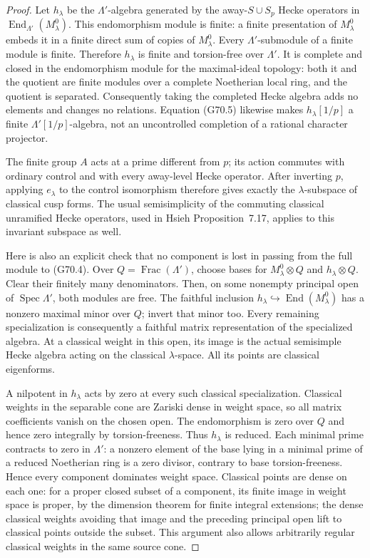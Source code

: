 \begin{proof}
Let $h_\lambda$ be the $\Lambda'$-algebra generated by the
away-$S\cup S_p$ Hecke operators in
$\operatorname{End}_{\Lambda'}(M^0_\lambda)$.
This endomorphism module is finite: a finite presentation of
$M^0_\lambda$ embeds it in a finite direct sum of copies of
$M^0_\lambda$.  Every $\Lambda'$-submodule of a finite
module is finite.  Therefore $h_\lambda$ is finite and
torsion-free over $\Lambda'$.
It is complete and closed in the endomorphism module for
the maximal-ideal topology: both it and the quotient are
finite modules over a complete Noetherian local ring, and
the quotient is separated.  Consequently taking the
completed Hecke algebra adds no elements and changes no
relations.  Equation (G70.5) likewise makes
$h_\lambda[1/p]$ a finite $\Lambda'[1/p]$-algebra, not an
uncontrolled completion of a rational character projector.

The finite group $A$ acts at a prime different from $p$;
its action commutes with ordinary control and with every
away-level Hecke operator.  After inverting $p$, applying
$e_\lambda$ to the control isomorphism therefore gives
exactly the $\lambda$-subspace of classical cusp forms.
The usual semisimplicity of the commuting classical
unramified Hecke operators, used in Hsieh
Proposition~7.17, applies to this invariant subspace as well.

Here is also an explicit check that no component is lost
in passing from the full module to (G70.4).
Over $Q=\operatorname{Frac}(\Lambda')$, choose bases for
$M^0_\lambda\otimes Q$ and $h_\lambda\otimes Q$.
Clear their finitely many denominators.  Then, on some
nonempty principal open of $\operatorname{Spec}\Lambda'$, both
modules are free.  The faithful inclusion
$h_\lambda\hookrightarrow\operatorname{End}(M^0_\lambda)$
has a nonzero maximal minor over $Q$; invert that minor
too.  Every remaining specialization is consequently a
faithful matrix representation of the specialized algebra.
At a classical weight in this open, its image is the
actual semisimple Hecke algebra acting on the classical
$\lambda$-space.  All its points are classical eigenforms.

A nilpotent in $h_\lambda$ acts by zero at every such
classical specialization.  Classical weights in the
separable cone are Zariski dense in weight space, so all
matrix coefficients vanish on the chosen open.  The
endomorphism is zero over $Q$ and hence zero integrally
by torsion-freeness.  Thus $h_\lambda$ is reduced.
Each minimal prime contracts to zero in $\Lambda'$:
a nonzero element of the base lying in a minimal prime
of a reduced Noetherian ring is a zero divisor, contrary
to base torsion-freeness.  Hence every component dominates
weight space.  Classical points are dense on each one:
for a proper closed subset of a component, its finite
image in weight space is proper, by the dimension theorem
for finite integral extensions; the dense classical
weights avoiding that image and the preceding principal
open lift to classical points outside the subset.
This argument also allows arbitrarily regular classical
weights in the same source cone.


\end{proof}
